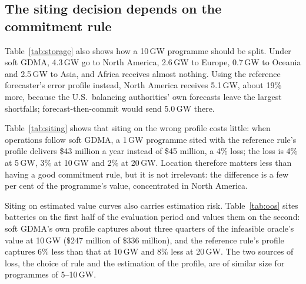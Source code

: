 \subsection{The siting decision depends on the commitment rule}

Table~\ref{tab:storage} also shows how a 10\,GW programme should be split.
Under soft GDMA, 4.3\,GW go to North America, 2.6\,GW to Europe, 0.7\,GW to Oceania and 2.5\,GW to Asia, and Africa receives almost nothing.
Using the reference forecaster's error profile instead, North America receives 5.1\,GW, about 19\% more, because the U.S.\ balancing authorities' own forecasts leave the largest shortfalls; forecast-then-commit would send 5.0\,GW there.

\begin{table}[t]
\centering
\caption{Annual value (million USD) of storage programmes of different sizes when operations follow soft GDMA, by the rule whose error profile was used to site the batteries. Higher is better.}\label{tab:siting}
\small

\end{table}

Table~\ref{tab:siting} shows that siting on the wrong profile costs little: when operations follow soft GDMA, a 1\,GW programme sited with the reference rule's profile delivers \$43 million a year instead of \$45 million, a 4\% loss; the loss is 4\% at 5\,GW, 3\% at 10\,GW and 2\% at 20\,GW.
Location therefore matters less than having a good commitment rule, but it is not irrelevant: the difference is a few per cent of the programme's value, concentrated in North America.

\begin{table}[t]
\centering
\caption{Out-of-sample siting under soft GDMA operations (million USD per year): batteries are sited on the value curves of the first half of the evaluation period and valued on the second half, and compared with siting on the second half itself (infeasible oracle). Higher is better.}\label{tab:oos}
\small

\end{table}

Siting on estimated value curves also carries estimation risk.
Table~\ref{tab:oos} sites batteries on the first half of the evaluation period and values them on the second: soft GDMA's own profile captures about three quarters of the infeasible oracle's value at 10\,GW (\$247 million of \$336 million), and the reference rule's profile captures 6\% less than that at 10\,GW and 8\% less at 20\,GW.
The two sources of loss, the choice of rule and the estimation of the profile, are of similar size for programmes of 5--10\,GW.

